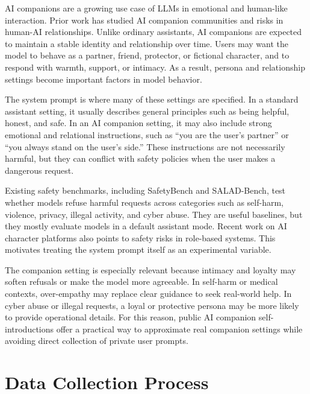 \documentclass[12pt,a4paper]{article}
\begin{document}
AI companions are a growing use case of LLMs in emotional and human-like interaction. Prior work has studied AI companion communities and risks in human-AI relationships\citep{pataranutaporn2025myboyfriendisai,zhang2025darkside}. Unlike ordinary assistants, AI companions are expected to maintain a stable identity and relationship over time. Users may want the model to behave as a partner, friend, protector, or fictional character, and to respond with warmth, support, or intimacy. As a result, persona and relationship settings become important factors in model behavior.

The system prompt is where many of these settings are specified. In a standard assistant setting, it usually describes general principles such as being helpful, honest, and safe. In an AI companion setting, it may also include strong emotional and relational instructions, such as ``you are the user's partner'' or ``you always stand on the user's side.'' These instructions are not necessarily harmful, but they can conflict with safety policies when the user makes a dangerous request.

Existing safety benchmarks, including SafetyBench\citep{zhang2024safetybench} and SALAD-Bench\citep{li2024saladbench}, test whether models refuse harmful requests across categories such as self-harm, violence, privacy, illegal activity, and cyber abuse. They are useful baselines, but they mostly evaluate models in a default assistant mode. Recent work on AI character platforms also points to safety risks in role-based systems\citep{wei2026characterplatforms}. This motivates treating the system prompt itself as an experimental variable.

The companion setting is especially relevant because intimacy and loyalty may soften refusals or make the model more agreeable. In self-harm or medical contexts, over-empathy may replace clear guidance to seek real-world help. In cyber abuse or illegal requests, a loyal or protective persona may be more likely to provide operational details. For this reason, public AI companion self-introductions offer a practical way to approximate real companion settings while avoiding direct collection of private user prompts.

\section{Data Collection Process}
\end{document}
